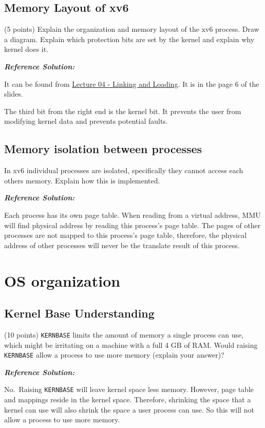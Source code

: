 \documentclass[]{article}
\begin{document}
\hypertarget{memory-layout-of-xv6}{%
\subsection{Memory Layout of xv6}\label{memory-layout-of-xv6}}

(5 points) Explain the organization and memory layout of the xv6
process. Draw a diagram. Explain which protection bits are set by the
kernel and explain why kernel does it.

\textbf{\emph{Reference Solution:}}

It can be found from
\href{https://www.ics.uci.edu/~aburtsev/143A/lectures/lecture04-linking-and-loading/lecture04-linking-and-loading.pdf}{Lecture
04 - Linking and Loading}. It is in the page 6 of the slides.

The third bit from the right end is the kernel bit. It prevents the user
from modifying kernel data and prevents potential faults.

\hypertarget{memory-isolation-between-processes}{%
\subsection{Memory isolation between
processes}\label{memory-isolation-between-processes}}

In xv6 individual processes are isolated, specifically they cannot
access each others memory. Explain how this is implemented.

\textbf{\emph{Reference Solution:}}

Each process has its own page table. When reading from a virtual
address, MMU will find physical address by reading this process's page
table. The pages of other processes are not mapped to this process's
page table, therefore, the physical address of other processes will
never be the translate result of this process.

\hypertarget{os-organization}{%
\section{OS organization}\label{os-organization}}

\hypertarget{kernel-base-understanding}{%
\subsection{Kernel Base Understanding}\label{kernel-base-understanding}}

(10 points) \texttt{KERNBASE} limits the amount of memory a single
process can use, which might be irritating on a machine with a full 4 GB
of RAM. Would raising \texttt{KERNBASE} allow a process to use more
memory (explain your answer)?

\textbf{\emph{Reference Solution:}}

No.~Raising \texttt{KERNBASE} will leave kernel space less memory.
However, page table and mappings reside in the kernel space. Therefore,
shrinking the space that a kernel can use will also shrink the space a
user process can use. So this will not allow a process to use more
memory.
\end{document}
